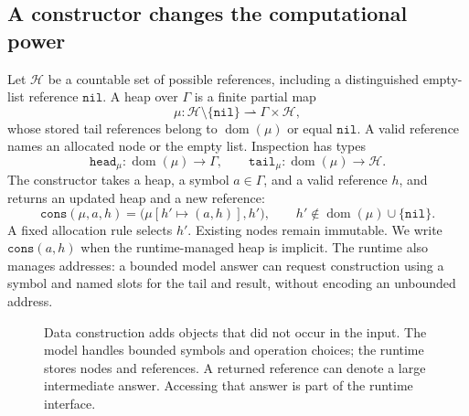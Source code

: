 \documentclass[11pt,twoside]{article}
\theoremstyle{definition}
\theoremstyle{remark}
\begin{document}
\subsection{A constructor changes the computational power}

Let $\mathcal H$ be a countable set of possible references, including a
distinguished empty-list reference $\mathtt{nil}$. A heap over $\Gamma$
is a finite partial map
\[
 \mu:\mathcal H\setminus\{\mathtt{nil}\}\rightharpoonup\Gamma\times\mathcal H,
\]
whose stored tail references belong to $\operatorname{dom}(\mu)$ or equal
$\mathtt{nil}$. A valid reference names an allocated node or the empty list.
Inspection has types
\begin{equation}
 \mathtt{head}_\mu:\operatorname{dom}(\mu)\to\Gamma,
 \qquad \mathtt{tail}_\mu:\operatorname{dom}(\mu)\to\mathcal H.
 \label{eq:constructors}
\end{equation}
The constructor takes a heap, a symbol $a\in\Gamma$, and a valid reference
$h$, and returns an updated heap and a new reference:
\begin{equation}
 \mathtt{cons}(\mu,a,h)=\bigl(\mu[h'\mapsto(a,h)],h'\bigr),
 \qquad h'\notin\operatorname{dom}(\mu)\cup\{\mathtt{nil}\}.
 \label{eq:cons-transition}
\end{equation}
A fixed allocation rule selects $h'$. Existing nodes remain immutable.
We write $\mathtt{cons}(a,h)$ when the runtime-managed heap is implicit.
The runtime also manages addresses: a bounded model answer can request
construction using a symbol and named slots for the tail and result,
without encoding an unbounded address.

\begin{figure}[htbp]
\centering
{}
\caption{Data construction adds objects that did not occur in the input.
The model handles bounded symbols and operation choices; the runtime stores
nodes and references. A returned reference can denote a large intermediate
answer. Accessing that answer is part of the runtime interface.}
\label{fig:constructed-data}
\end{figure}
\end{document}
